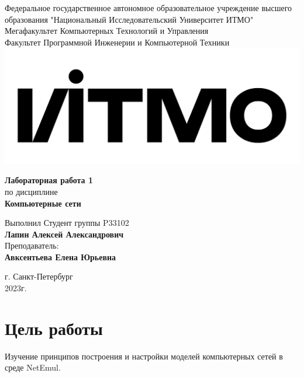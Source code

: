 \documentclass[12pt,onecolumn]{article}
\begin{document}
\setcounter{tocdepth}{4}
\begin{center}
    Федеральное государственное автономное образовательное учреждение высшего образования "Национальный Исследовательский Университет ИТМО"\\ 
    Мегафакультет Компьютерных Технологий и Управления\\
    Факультет Программной Инженерии и Компьютерной Техники \\
    \includegraphics[scale=0.3]{image/itmo.jpg} %
\end{center}
\vspace{1cm}


\begin{center}
    \textbf{Лабораторная работа 1}\\
    по дисциплине\\
    \textbf{Компьютерные сети}
\end{center}

\vspace{2cm}

\begin{flushright}
  Выполнил Студент  группы P33102\\
  \textbf{Лапин Алексей Александрович}\\
  Преподаватель: \\
  \textbf{Авксентьева Елена Юрьевна}\\
\end{flushright}

\vspace{6cm}
\begin{center}
    г. Санкт-Петербург\\
    2023г.
\end{center}

\newpage
\tableofcontents
\newpage

\section*{Цель работы}
Изучение принципов построения и настройки моделей компьютерных сетей в среде NetEmul.
\end{document}
